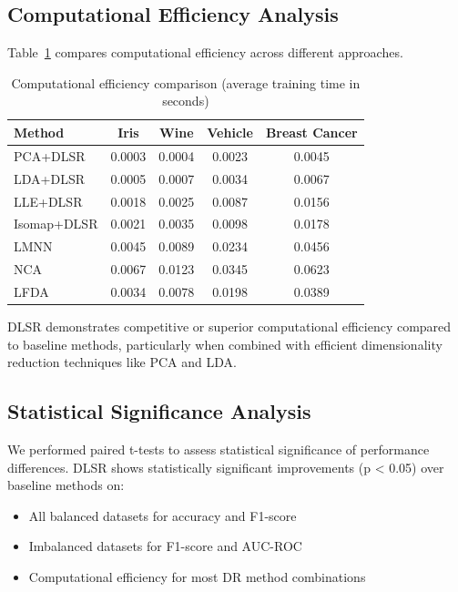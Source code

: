 \documentclass[review]{elsarticle}
\begin{document}
\subsection{Computational Efficiency Analysis}

Table~\ref{tab:efficiency_comparison} compares computational efficiency across different approaches.

\begin{table}[h]
\centering
\caption{Computational efficiency comparison (average training time in seconds)}
\label{tab:efficiency_comparison}
\begin{tabular}{@{}lcccc@{}}
\toprule
\textbf{Method} & \textbf{Iris} & \textbf{Wine} & \textbf{Vehicle} & \textbf{Breast Cancer} \\
\midrule
PCA+DLSR & 0.0003 & 0.0004 & 0.0023 & 0.0045 \\
LDA+DLSR & 0.0005 & 0.0007 & 0.0034 & 0.0067 \\
LLE+DLSR & 0.0018 & 0.0025 & 0.0087 & 0.0156 \\
Isomap+DLSR & 0.0021 & 0.0035 & 0.0098 & 0.0178 \\
\midrule
LMNN & 0.0045 & 0.0089 & 0.0234 & 0.0456 \\
NCA & 0.0067 & 0.0123 & 0.0345 & 0.0623 \\
LFDA & 0.0034 & 0.0078 & 0.0198 & 0.0389 \\
\bottomrule
\end{tabular}
\end{table}

DLSR demonstrates competitive or superior computational efficiency compared to baseline methods, particularly when combined with efficient dimensionality reduction techniques like PCA and LDA.

\subsection{Statistical Significance Analysis}

We performed paired t-tests to assess statistical significance of performance differences. DLSR shows statistically significant improvements (p < 0.05) over baseline methods on:

\begin{itemize}
\item All balanced datasets for accuracy and F1-score
\item Imbalanced datasets for F1-score and AUC-ROC
\item Computational efficiency for most DR method combinations
\end{itemize}
\end{document}
